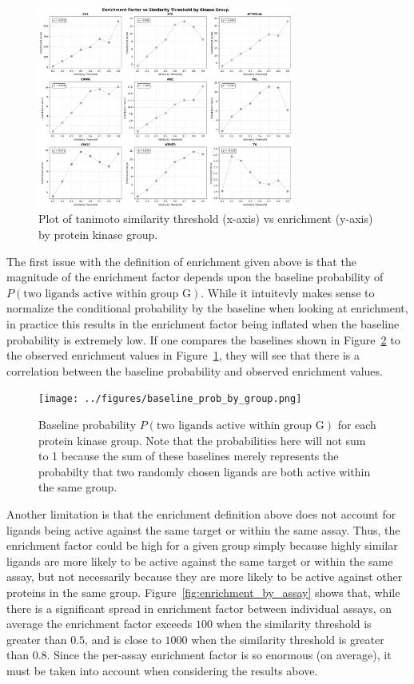 \documentclass[11pt]{article}
\begin{document}
\begin{figure}[H]
    \centering
    \includegraphics[width=0.75\textwidth]{../figures/enrichment_factor_by_group.png}
    \caption{Plot of tanimoto similarity threshold (x-axis) vs enrichment (y-axis) by protein kinase group.}
    \label{fig:enrichment_plot}
\end{figure}

The first issue with the definition of enrichment given above is that the magnitude of the enrichment factor depends upon the baseline probability of $P(\text{two ligands active within group G})$. 
While it intuitevly makes sense to normalize the conditional probability by the baseline when looking at enrichment, in practice this results in the enrichment factor being inflated when the baseline probability is extremely low.  
If one compares the baselines shown in Figure~\ref{fig:baseline_probs} to the observed enrichment values in Figure~\ref{fig:enrichment_plot}, they will see that there is a correlation between the baseline probability and observed enrichment values. 

\begin{figure}[H]
    \centering
    \texttt{[image: ../figures/baseline\_prob\_by\_group.png]}
    \caption{Baseline probability $P(\text{two ligands active within group G})$ for each protein kinase group. Note that the probabilities here will not sum to 1 because the sum of these baselines merely represents the probabilty that two randomly chosen ligands are both active within the same group.}
    \label{fig:baseline_probs}
\end{figure}

Another limitation is that the enrichment definition above does not account for ligands being active against the same target or within the same assay. 
Thus, the enrichment factor could be high for a given group simply because highly similar ligands are more likely to be active against the same target or within the same assay, but not necessarily because they are more likely to be active against other proteins in the same group. 
Figure~\ref{fig:enrichment_by_assay} shows that, while there is a significant spread in enrichment factor between individual assays, on average the enrichment factor exceeds $100$ when the similarity threshold is greater than $0.5$, and is close to $1000$ when the similarity threshold is greater than $0.8$. 
Since the per-assay enrichment factor is so enormous (on average), it must be taken into account when considering the results above. 
\end{document}
